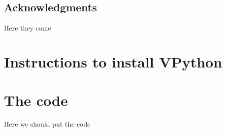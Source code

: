 \documentclass[12pt]{iopart}
\begin{document}
%

\subsection{Acknowledgments}
Here they come

\appendix
\section{Instructions to install VPython}
\label{appendix:python}

\section{The code}
Here we should put the code
 



\end{document}
